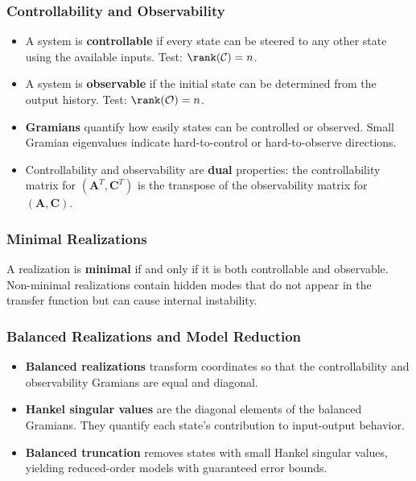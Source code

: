\subsubsection{Controllability and Observability}

\begin{itemize}
\item A system is \textbf{controllable} if every state can be steered to any other state using the available inputs. Test: $\rank(\mathcal{C}) = n$.

\item A system is \textbf{observable} if the initial state can be determined from the output history. Test: $\rank(\mathcal{O}) = n$.

\item \textbf{Gramians} quantify how easily states can be controlled or observed. Small Gramian eigenvalues indicate hard-to-control or hard-to-observe directions.

\item Controllability and observability are \textbf{dual} properties: the controllability matrix for $(\mathbf{A}^T, \mathbf{C}^T)$ is the transpose of the observability matrix for $(\mathbf{A}, \mathbf{C})$.
\end{itemize}

\subsubsection{Minimal Realizations}

A realization is \textbf{minimal} if and only if it is both controllable and observable. Non-minimal realizations contain hidden modes that do not appear in the transfer function but can cause internal instability.

\subsubsection{Balanced Realizations and Model Reduction}

\begin{itemize}
\item \textbf{Balanced realizations} transform coordinates so that the controllability and observability Gramians are equal and diagonal.

\item \textbf{Hankel singular values} are the diagonal elements of the balanced Gramians. They quantify each state's contribution to input-output behavior.

\item \textbf{Balanced truncation} removes states with small Hankel singular values, yielding reduced-order models with guaranteed error bounds.
\end{itemize}

